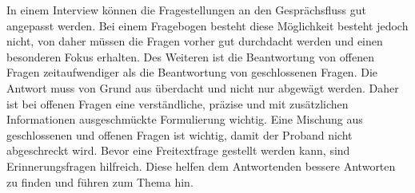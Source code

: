 In einem Interview können die Fragestellungen an den Gesprächsfluss gut angepasst werden.
Bei einem Fragebogen besteht diese Möglichkeit besteht jedoch nicht, von daher müssen die Fragen vorher gut durchdacht werden und einen besonderen Fokus erhalten.
Des Weiteren ist die Beantwortung von offenen Fragen zeitaufwendiger als die Beantwortung  von geschlossenen Fragen. 
Die Antwort muss von Grund aus überdacht und nicht nur abgewägt werden. 
Daher ist bei offenen Fragen eine verständliche, präzise und mit zusätzlichen Informationen ausgeschmückte Formulierung wichtig. 
Eine Mischung aus geschlossenen und offenen Fragen ist wichtig, damit der Proband nicht abgeschreckt wird.
Bevor eine Freitextfrage gestellt werden kann, sind Erinnerungsfragen hilfreich.
Diese helfen dem Antwortenden bessere Antworten zu finden und führen zum Thema hin\autocite[S.35]{2009Fragebogen}.%
